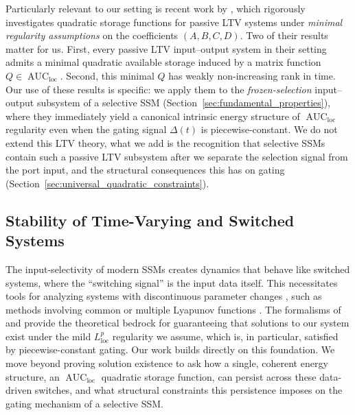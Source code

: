 \documentclass[10pt]{article} %
\newcommand{\loc}{\mathrm{loc}}                         %
\DeclareMathOperator{\AUC}{AUC}                         %
\theoremstyle{definition}
\begin{document}
Particularly relevant to our setting is recent work by \citet{MorandinHinsen2024}, which rigorously investigates quadratic storage functions for passive LTV systems under \emph{minimal regularity assumptions} on the coefficients $(A,B,C,D)$. Two of their results matter for us. First, every passive LTV input--output system in their setting admits a minimal quadratic available storage induced by a matrix function $Q\in\AUC_{\loc}$. Second, this minimal $Q$ has weakly non-increasing rank in time. Our use of these results is specific: we apply them to the \emph{frozen-selection} input--output subsystem of a selective SSM (Section~\ref{sec:fundamental_properties}), where they immediately yield a canonical intrinsic energy structure of $\AUC_{\loc}$ regularity even when the gating signal $\Delta(t)$ is piecewise-constant. We do not extend this LTV theory, what we add is the recognition that selective SSMs contain such a passive LTV subsystem after we separate the selection signal from the port input, and the structural consequences this has on gating (Section~\ref{sec:universal_quadratic_constraints}).

\subsection{Stability of Time-Varying and Switched Systems}
The input-selectivity of modern SSMs creates dynamics that behave like switched systems, where the ``switching signal'' is the input data itself. This necessitates tools for analyzing systems with discontinuous parameter changes \citep{liberzon2003switching}, such as methods involving common or multiple Lyapunov functions \citep{branicky1998multiple}. The formalisms of \citet{filippov1988existence} and \citet{coddington1956theory} provide the theoretical bedrock for guaranteeing that solutions to our system exist under the mild $L^p_{\loc}$ regularity we assume, which is, in particular, satisfied by piecewise-constant gating. Our work builds directly on this foundation. We move beyond proving solution existence to ask how a single, coherent energy structure, an $\AUC_{\loc}$ quadratic storage function, can persist across these data-driven switches, and what structural constraints this persistence imposes on the gating mechanism of a selective SSM.
\end{document}
